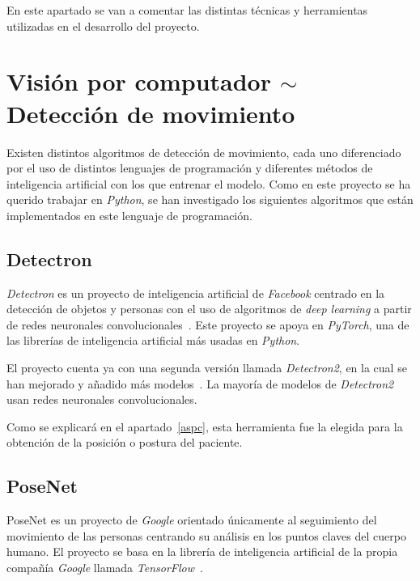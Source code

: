 
En este apartado se van a comentar las distintas técnicas y herramientas utilizadas en el desarrollo del proyecto.

\section{Visión por computador $\sim$ Detección de movimiento}
Existen distintos algoritmos de detección de movimiento, cada uno diferenciado por el uso de distintos lenguajes de programación y diferentes métodos de inteligencia artificial con los que entrenar el modelo. Como en este proyecto se ha querido trabajar en \textit{Python}, se han investigado los siguientes algoritmos que están implementados en este lenguaje de programación. 

\subsection{Detectron}\label{dectectron}
\textit{Detectron} es un proyecto de inteligencia artificial de \textit{Facebook} centrado en la detección de objetos y personas con el uso de algoritmos de \textit{deep learning} a partir de redes neuronales convolucionales~\cite{Detectron2018}. Este proyecto se apoya en \textit{PyTorch}, una de las librerías de inteligencia artificial más usadas en \textit{Python}.

El proyecto cuenta ya con una segunda versión llamada \textit{Detectron2}, en la cual se han mejorado y añadido más modelos~\cite{wu2019detectron2}. La mayoría de modelos de \textit{Detectron2} usan redes neuronales convolucionales.

Como se explicará en el apartado~\ref{aspc}, esta herramienta fue la elegida para la obtención de la posición o postura del paciente.


\subsection{PoseNet}
PoseNet es un proyecto de \textit{Google} orientado únicamente al seguimiento del movimiento de las personas centrando su análisis en los puntos claves del cuerpo humano. El proyecto se basa en la librería de inteligencia artificial de la propia compañía \textit{Google} llamada \textit{TensorFlow}~\cite{tensorflow2015-whitepaper}.


